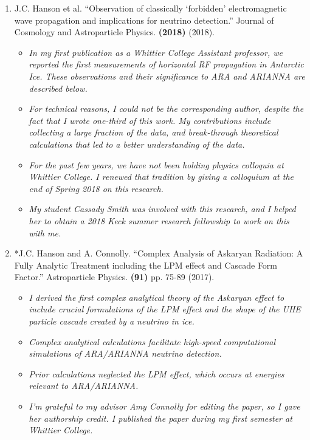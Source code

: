 \documentclass[../../main.tex]{subfiles}
\begin{document}
\begin{enumerate}
\item J.C. Hanson et al. ``Observation of classically ‘forbidden’ electromagnetic wave propagation and implications for neutrino detection.'' Journal of Cosmology and Astroparticle Physics. \textbf{(2018)} (2018).
\begin{itemize}
\item \textit{In my first publication as a Whittier College Assistant professor, we reported the first measurements of horizontal RF propagation in Antarctic Ice.  These observations and their significance to ARA and ARIANNA are described below.}
\item \textit{For technical reasons, I could not be the corresponding author, despite the fact that I wrote one-third of this work.  My contributions include collecting a large fraction of the data, and break-through theoretical calculations that led to a better understanding of the data.}
\item \textit{For the past few years, we have not been holding physics colloquia at Whittier College.  I renewed that tradition by giving a colloquium at the end of Spring 2018 on this research.}
\item \textit{My student Cassady Smith was involved with this research, and I helped her to obtain a 2018 Keck summer research fellowship to work on this with me.}
\end{itemize}
\item *J.C. Hanson and A. Connolly. ``Complex Analysis of Askaryan Radiation: A Fully Analytic Treatment including the LPM effect and Cascade Form Factor.'' Astroparticle Physics. \textbf{(91)} pp. 75-89 (2017).
\begin{itemize}
\item \textit{I derived the first complex analytical theory of the Askaryan effect to include crucial formulations of the LPM effect and the shape of the UHE particle cascade created by a neutrino in ice.}
\item \textit{Complex analytical calculations facilitate high-speed computational simulations of ARA/ARIANNA neutrino detection.}
\item \textit{Prior calculations neglected the LPM effect, which occurs at energies relevant to ARA/ARIANNA.}
\item \textit{I'm grateful to my advisor Amy Connolly for editing the paper, so I gave her authorship credit.  I published the paper during my first semester at Whittier College.}
\end{itemize}

\end{enumerate}
\end{document}
